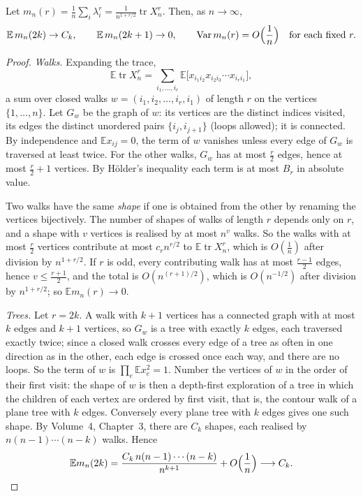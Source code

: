 \begin{lemma}\label{moments:lem:walks}
Let $m_n(r)=\frac1n\sum_i\lambda_i^r=\frac1{n^{1+r/2}}\operatorname{tr}X_n^r$. Then, as $n\to\infty$,
\[
\mathbb E\,m_n(2k)\to C_k,\qquad\mathbb E\,m_n(2k+1)\to0,\qquad\operatorname{Var}m_n(r)=O\Bigl(\frac1n\Bigr)\quad\text{for each fixed }r.
\]
\end{lemma}
\begin{proof}
\emph{Walks.} Expanding the trace,
\[
\mathbb E\operatorname{tr}X_n^r=\sum_{i_1,\dots,i_r}\mathbb E\bigl[x_{i_1i_2}x_{i_2i_3}\cdots x_{i_ri_1}\bigr],
\]
a sum over closed walks $w=(i_1,i_2,\dots,i_r,i_1)$ of length $r$ on the vertices $\{1,\dots,n\}$. Let $G_w$ be the graph of $w$: its vertices are the
distinct indices visited, its edges the distinct unordered pairs $\{i_j,i_{j+1}\}$ (loops allowed); it is connected. By independence and $\mathbb Ex_{ij}=0$,
the term of $w$ vanishes unless every edge of $G_w$ is traversed at least twice. For the other walks, $G_w$ has at most $\frac r2$ edges, hence at most
$\frac r2+1$ vertices. By H\"older's inequality each term is at most $B_r$ in absolute value.

Two walks have the same \emph{shape} if one is obtained from the other by renaming the vertices bijectively. The number of shapes of walks of length $r$
depends only on $r$, and a shape with $v$ vertices is realised by at most $n^v$ walks. So the walks with at most $\frac r2$ vertices contribute at most
$c_rn^{r/2}$ to $\mathbb E\operatorname{tr}X_n^r$, which is $O(\frac1n)$ after division by $n^{1+r/2}$. If $r$ is odd, every contributing walk has at most $\frac{r-1}2$ edges, hence $v\le\frac{r+1}2$, and the
total is $O(n^{(r+1)/2})$, which is $O(n^{-1/2})$ after division by $n^{1+r/2}$; so $\mathbb Em_n(r)\to0$.

\emph{Trees.} Let $r=2k$. A walk with $k+1$ vertices has a connected graph with at most $k$ edges and $k+1$ vertices, so $G_w$ is a tree with exactly $k$ edges,
each traversed exactly twice; since a closed walk crosses every edge of a tree as often in one direction as in the other, each edge is crossed once
each way, and there are no loops. So the term of $w$ is $\prod_{e}\mathbb Ex_e^2=1$. Number the vertices of $w$ in the order of their first visit: the shape
of $w$ is then a depth-first exploration of a tree in which the children of each vertex are ordered by first visit, that is, the contour walk of a plane
tree with $k$ edges. Conversely every plane tree with $k$ edges gives one such shape. By Volume~4, Chapter~3, there are $C_k$ shapes, each realised
by $n(n-1)\cdots(n-k)$ walks. Hence
\[
\mathbb Em_n(2k)=\frac{C_k\,n(n-1)\cdots(n-k)}{n^{k+1}}+O\Bigl(\frac1n\Bigr)\longrightarrow C_k.
\]


\end{proof}
